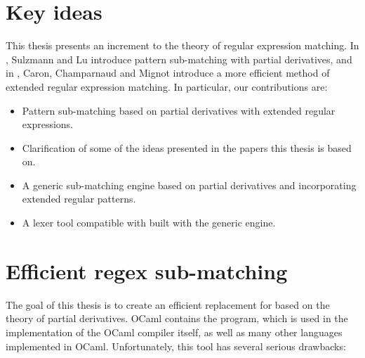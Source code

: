\section{Key ideas}

This thesis presents an increment to the theory of regular expression matching.
In \cite{pdpat}, Sulzmann and Lu introduce pattern sub-matching with partial
derivatives, and in \cite{pdere}, Caron, Champarnaud and Mignot introduce a more
efficient method of extended regular expression matching. In particular, our
contributions are:

\begin{itemize}

   \item Pattern sub-matching based on partial derivatives with extended regular
      expressions.

   \item Clarification of some of the ideas presented in the papers this thesis
      is based on.

   \item A generic sub-matching engine based on partial derivatives and
      incorporating extended regular patterns.

   \item A lexer tool compatible with \ocamllex{} built with the generic engine.

\end{itemize}


\section{Efficient regex sub-matching}

The goal of this thesis is to create an efficient replacement for \ocamllex{}
based on the theory of partial derivatives. OCaml contains the \ocamllex{}
program, which is used in the implementation of the OCaml compiler itself, as
well as many other languages implemented in OCaml.  Unfortunately, this tool has
several serious drawbacks:

